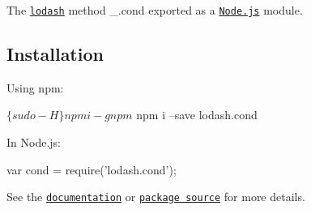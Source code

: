 The \href{https://lodash.com/}{\tt lodash} method {\ttfamily \+\_\+.\+cond} exported as a \href{https://nodejs.org/}{\tt Node.\+js} module.

\subsection*{Installation}

Using npm\+: 
\begin{DoxyCode}
$ \{sudo -H\} npm i -g npm
$ npm i --save lodash.cond
\end{DoxyCode}


In Node.\+js\+: 
\begin{DoxyCode}
var cond = require('lodash.cond');
\end{DoxyCode}


See the \href{https://lodash.com/docs#cond}{\tt documentation} or \href{https://github.com/lodash/lodash/blob/4.5.2-npm-packages/lodash.cond}{\tt package source} for more details. 